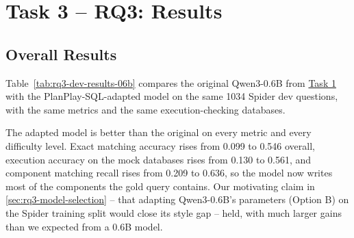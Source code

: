 \section{Task 3 -- RQ3: Results}
\label{sec:rq3-results}

\subsection{Overall Results}
\label{sec:rq3-results-overall}

Table~\ref{tab:rq3-dev-results-06b} compares the original Qwen3-0.6B from \hyperref[sec:rq1-results]{Task 1} with the PlanPlay-SQL-adapted model on the same 1034 Spider dev questions, with the same metrics and the same execution-checking databases.

\begin{table}[H]
\centering
\footnotesize
\caption{Original and adapted Qwen3-0.6B on the Spider dev set, overall and by difficulty. Component matching is accuracy / recall / F1 (macro-averaged as in \hyperref[sec:rq1-interpretation]{Task 1}). Execution accuracy is on mock databases.}
\label{tab:rq3-dev-results-06b}
\end{table}

The adapted model is better than the original on every metric and every difficulty level. Exact matching accuracy rises from 0.099 to 0.546 overall, execution accuracy on the mock databases rises from 0.130 to 0.561, and component matching recall rises from 0.209 to 0.636, so the model now writes most of the components the gold query contains. Our motivating claim in \ref{sec:rq3-model-selection} -- that adapting Qwen3-0.6B's parameters (Option B) on the Spider training split would close its style gap -- held, with much larger gains than we expected from a 0.6B model.

